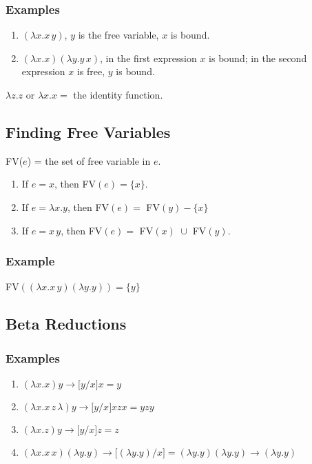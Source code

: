 \documentclass[]{article}
\begin{document}
\subsubsection*{Examples}
\begin{enumerate}
\item $(\lambda x.x\,y)$, $y$ is the free variable, $x$ is bound.
\item $(\lambda x.x)(\lambda y.y\,x)$, in the first expression $x$ is bound; in
the second expression $x$ is free, $y$ is bound.
\end{enumerate}
$\lambda z.z$ or $\lambda x.x =$ the identity function.

\subsection*{Finding Free Variables}
FV($e$) = the set of free variable in $e$.
\begin{enumerate}
\item If $e = x$, then FV$(e) = \{x\}$.
\item If $e = \lambda x.y$, then FV$(e) =$ FV$(y) - \{x\}$
\item If $e = x\,y$, then FV$(e) =$ FV$(x)\,\,\cup$ FV$(y)$.
\end{enumerate}
\subsubsection*{Example}
FV$((\lambda x.x\,y)(\lambda y.y)) = \{y\}$

\subsection*{Beta Reductions}
\subsubsection*{Examples}
\begin{enumerate}
\item $(\lambda x.x)y \rightarrow \lbrack y/x \rbrack x = y$
\item $(\lambda x.x\,z\,\lambda)y \rightarrow \lbrack y/x \rbrack xzx = yzy$
\item $(\lambda x.z)y \rightarrow \lbrack y/x \rbrack z = z$
\item $(\lambda x.x\,x)(\lambda y.y) \rightarrow \lbrack (\lambda y.y)/x \rbrack
= (\lambda y.y)(\lambda y.y) \rightarrow (\lambda y.y)$
\end{enumerate}
\end{document}
